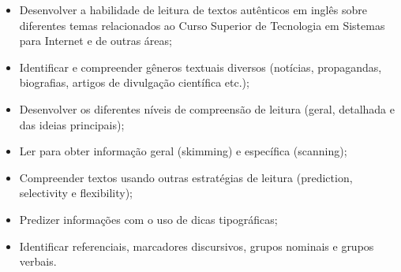 \begin{itemize}

\item Desenvolver a habilidade de leitura de textos autênticos em inglês sobre diferentes temas relacionados ao Curso Superior de Tecnologia em Sistemas para Internet e de outras áreas;

\item Identificar e compreender gêneros textuais diversos (notícias, propagandas, biografias, artigos de divulgação científica etc.);

\item Desenvolver os diferentes níveis de compreensão de leitura (geral, detalhada e das ideias principais);

\item Ler para obter informação geral (skimming) e específica (scanning);

\item Compreender textos usando outras estratégias de leitura (prediction, selectivity e 
flexibility);

\item Predizer informações com o uso de dicas tipográficas;

\item Identificar referenciais, marcadores discursivos, grupos nominais e grupos verbais.

\end{itemize} 








